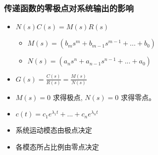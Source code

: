 \documentclass{article}
\begin{document}
\begin{frame}
\frametitle{传递函数的零极点对系统输出的影响}
\label{sec-2-2-5}

\begin{itemize}
\item <2-> $N(s)C(s)=M(s)R(s)$
\begin{itemize}
\item $M(s)=(b_m s^m+b_{m-1}s^{m-1}+...+b_0)$
\item $N(s)=(a_n s^n+a_{n-1}s^{n-1}+...+a_0)$
\end{itemize}
\item <3-> $G(s)=\frac{C(s)}{R(s)}=\frac{M(s)}{N(s)}$
\item <4-> $M(s)=0$ 求得极点, $N(s)=0$ 求得零点。
\item <5-> $c(t)=c_1e^{\lambda_1 t}+...+c_ne^{\lambda_n t}$
\item <6-> 系统运动模态由极点决定
\item <7-> 各模态所占比例由零点决定
\end{itemize}
\end{frame}
\end{document}
